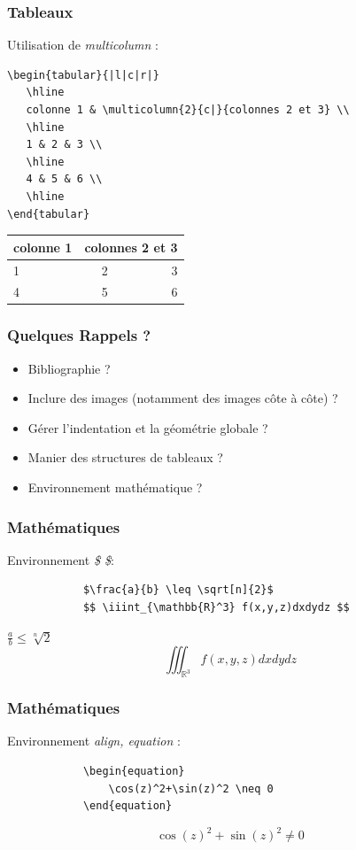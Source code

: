 \documentclass[handout]{beamer}
\begin{document}
\begin{frame}[fragile=singleslide]
	\frametitle{Tableaux}
	\centering
	Utilisation de \textit{multicolumn} :
	\begin{verbatim}
\begin{tabular}{|l|c|r|}
   \hline
   colonne 1 & \multicolumn{2}{c|}{colonnes 2 et 3} \\
   \hline
   1 & 2 & 3 \\
   \hline
   4 & 5 & 6 \\
   \hline
\end{tabular}
	\end{verbatim}

	\begin{tabular}{|l|c|r|}
	   \hline
	   colonne 1 & \multicolumn{2}{c|}{colonnes 2 et 3} \\
	   \hline
	   1 & 2 & 3 \\
	   \hline
	   4 & 5 & 6 \\
	   \hline
	\end{tabular}

\end{frame}

	\begin{frame}
		\frametitle{Quelques Rappels ?}
		\begin{itemize}
			\item Bibliographie ?
			\item Inclure des images (notamment des images côte à côte) ?
			\item Gérer l'indentation et la géométrie globale ?
			\item Manier des structures de tableaux ?
			\item Environnement mathématique ?
		\end{itemize}
	\end{frame}

	\begin{frame}[fragile=singleslide]
		\frametitle{Mathématiques}

		\centering
		Environnement \textit{\$ \$}:
		\begin{verbatim}
			$\frac{a}{b} \leq \sqrt[n]{2}$
			$$ \iiint_{\mathbb{R}^3} f(x,y,z)dxdydz $$
		\end{verbatim}

		$\frac{a}{b} \leq \sqrt[n]{2}$
		$$ \iiint_{\mathbb{R}^3} f(x,y,z)dxdydz $$

	\end{frame}

	\begin{frame}[fragile=singleslide]
		\frametitle{Mathématiques}
		\centering
		Environnement \textit{align, equation} :
		\begin{verbatim}
			\begin{equation}
				\cos(z)^2+\sin(z)^2 \neq 0
			\end{equation}
		\end{verbatim}

		\begin{equation}
			\cos(z)^2+\sin(z)^2 \neq 0
		\end{equation}


	\end{frame}
\end{document}
